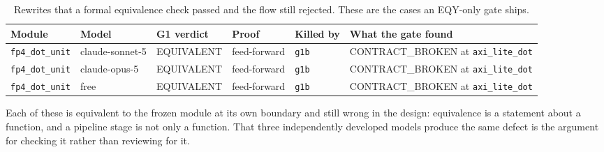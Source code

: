 \begin{table}[htbp]
  \centering
  \footnotesize
  \caption{Rewrites that a formal equivalence check passed and the flow still rejected. These are the cases an EQY-only gate ships.}
  \label{tab:g1b}
  \begin{adjustbox}{max width=\textwidth}
  \begin{tabular}{llllll}
    \toprule
    \textbf{Module} & \textbf{Model} & \textbf{G1 verdict} & \textbf{Proof} & \textbf{Killed by} & \textbf{What the gate found} \\
    \midrule
    \texttt{fp4\_dot\_unit} & claude-sonnet-5 & EQUIVALENT & feed-forward & \texttt{g1b} & CONTRACT\_BROKEN at \texttt{axi\_lite\_dot} \\
    \texttt{fp4\_dot\_unit} & claude-opus-5 & EQUIVALENT & feed-forward & \texttt{g1b} & CONTRACT\_BROKEN at \texttt{axi\_lite\_dot} \\
    \texttt{fp4\_dot\_unit} & free & EQUIVALENT & feed-forward & \texttt{g1b} & CONTRACT\_BROKEN at \texttt{axi\_lite\_dot} \\
    \bottomrule
  \end{tabular}
  \end{adjustbox}
  \par\smallskip\footnotesize\raggedright Each of these is equivalent to the frozen module at its own boundary and still wrong in the design: equivalence is a statement about a function, and a pipeline stage is not only a function. That three independently developed models produce the same defect is the argument for checking it rather than reviewing for it.
\end{table}

